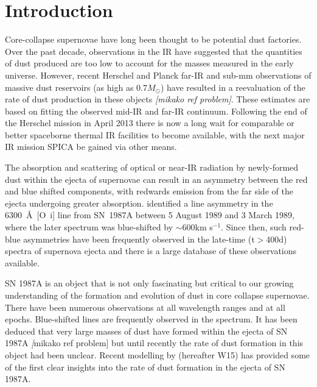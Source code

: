 \documentclass[useAMS,usenatbib,usegraphicx]{mnras}
\begin{document}
\section{Introduction}

Core-collapse supernovae have long been thought to be potential dust 
factories.  Over the past decade, observations in the IR have suggested 
that the quantities of dust produced are too low to account for the masses 
measured in the early universe.  However, recent Herschel and Planck 
far-IR and sub-mm observations of massive dust reservoirs (as high as 
0.7$M_{\odot}$) have resulted in a reevaluation of the rate of dust 
production in these objects \citep{Barlow2010,Gomez2012b} \textit{[mikako 
ref problem]}.  These estimates are based on fitting the observed mid-IR 
and far-IR continuum. Following the end of the Herschel mission in April 
2013 there is now a long wait for comparable or better spaceborne thermal 
IR facilities to become available, with the next major IR mission SPICA 
be gained via other means.
   
The absorption and scattering of optical or near-IR radiation by 
newly-formed dust within the ejecta of supernovae can result in an 
asymmetry between the red and blue shifted components, with redwards 
emission from the far side of the ejecta undergoing greater absorption.  
\citet{Lucy1989a} identified a line asymmetry in the 6300~\AA\ [O~{\sc i}]  
line from SN~1987A between 5 August 1989 and 3 March 1989, where the later 
spectrum was blue-shifted by $\sim 600 $km s$^{-1}$. Since then, such 
red-blue asymmetries have been frequently observed in the late-time 
(t$>$400d) spectra of supernova ejecta and there is a large database of 
these observations 
available\citep{1998S_2,SN1998S,FabbriEtAl11,LucyEtAl89}.

SN 1987A is an object that is not only fascinating but critical to our 
growing understanding of the formation and evolution of dust in core 
collapse supernovae.  There have been numerous observations at all 
wavelength ranges and at all epochs. Blue-shifted lines are frequently 
observed in the spectrum.  It has been deduced that very large masses of 
dust have formed within the ejecta of SN 1987A \textit[mikako ref problem] 
but until recently the rate of dust formation in this object had been 
unclear.  Recent modelling by \citet{Wesson2015} (hereafter W15) has 
provided some of the first clear insights into the rate of dust formation 
in the ejecta of SN 1987A.
\end{document}
